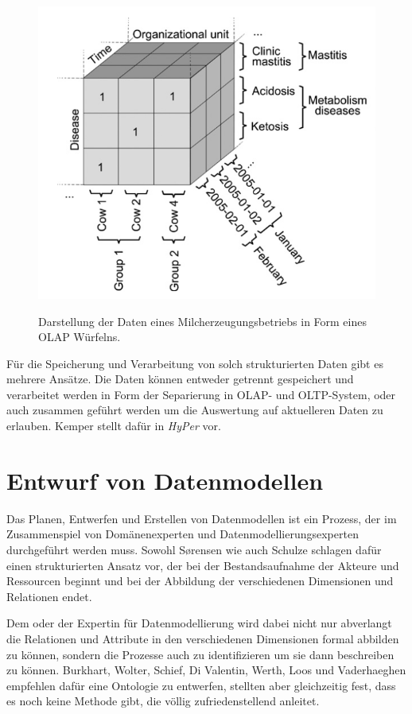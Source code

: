 \begin{figure}[h]
 \includegraphics[scale=0.5,natwidth=\textwidth]{figures/datamodelling/kuehe_olap_wuerfel_schulze2007.png}
 \centering
 \label{fig:kuehe_olap}
 \caption{Darstellung der Daten eines Milcherzeugungsbetriebs in Form eines OLAP Würfelns.\cite{jour:Schulze2007}}
\end{figure}

Für die Speicherung und Verarbeitung von solch strukturierten Daten gibt es mehrere Ansätze. Die Daten können entweder getrennt gespeichert und verarbeitet werden in Form der Separierung in OLAP- und OLTP-System, oder auch zusammen geführt werden um die Auswertung auf aktuelleren Daten zu erlauben. Kemper stellt dafür in \cite{jour:Kemper2011} \textit{HyPer} vor.

\section{Entwurf von Datenmodellen}
Das Planen, Entwerfen und Erstellen von Datenmodellen ist ein Prozess, der im Zusammenspiel von Domänenexperten und Datenmodellierungsexperten durchgeführt werden muss. Sowohl S\o rensen wie auch Schulze schlagen dafür einen strukturierten Ansatz vor, der bei der Bestandsaufnahme der Akteure und Ressourcen beginnt und bei der Abbildung der verschiedenen Dimensionen und Relationen endet.\cite{jour:Schulze2007}\cite{jour:Sorensen2010}

Dem oder der Expertin für Datenmodellierung wird dabei nicht nur abverlangt die Relationen und Attribute in den verschiedenen Dimensionen formal abbilden zu können, sondern die Prozesse auch zu identifizieren um sie dann beschreiben zu können. Burkhart, Wolter, Schief, Di Valentin, Werth, Loos und Vaderhaeghen empfehlen dafür eine Ontologie zu entwerfen, stellten aber gleichzeitig fest, dass es noch keine Methode gibt, die völlig zufriedenstellend anleitet.\cite{jour:Burkhart2012} 

